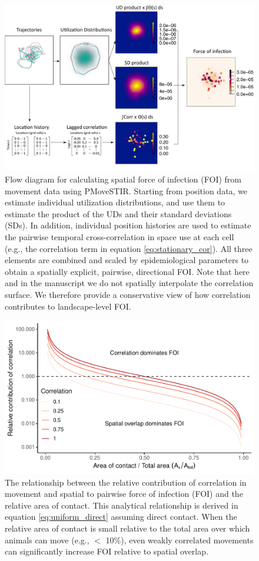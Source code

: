 ﻿\documentclass[11pt]{article}
\begin{document}
 \begin{figure}
     \includegraphics[width=\textwidth]{figures/steps_diagram.png}
     \caption{Flow diagram for calculating spatial force of infection (FOI) from movement data using PMoveSTIR. Starting from position data, we estimate individual utilization distributions, and use them to estimate the product of the UDs and their standard deviations (SDs). In addition, individual position histories are used to estimate the pairwise temporal cross-correlation in space use at each cell (e.g., the correlation term in equation \ref{eq:stationary_cor}). All three elements are combined and scaled by epidemiological parameters to obtain a spatially explicit, pairwise, directional FOI. Note that here and in the manuscript we do not spatially interpolate the correlation surface. We therefore provide a conservative view of how correlation contributes to landscape-level FOI.}
  \label{fig:steps}
 \end{figure}

\begin{figure}
    \includegraphics[width=\textwidth]{figures/correlation_analytical_figure.pdf}
    \caption{The relationship between the relative contribution of correlation in movement and spatial to pairwise force of infection (FOI) and the relative area of contact. This analytical relationship is derived in equation \ref{eq:uniform_direct} assuming direct contact.  When the relative area of contact is small relative to the total area over which animals can move (e.g., $<$ 10\%), even weakly correlated movements can significantly increase FOI relative to spatial overlap.}
    \label{fig:analytical_corr}
\end{figure}
\end{document}
